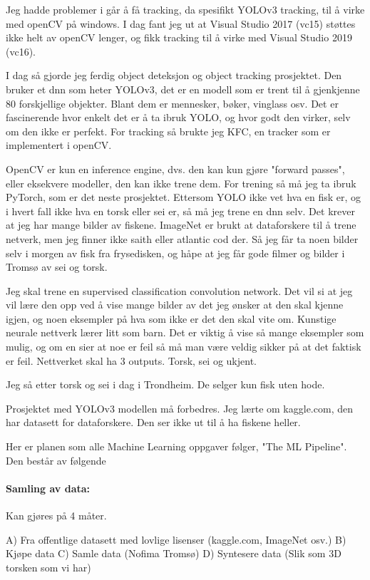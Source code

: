 Jeg hadde problemer i går å få tracking, da spesifikt YOLOv3 tracking, til å virke med openCV på windows. I dag fant jeg ut at Visual Studio 2017 (vc15) støttes ikke helt av openCV lenger, og fikk tracking til å virke med Visual Studio 2019 (vc16).

I dag så gjorde jeg ferdig object deteksjon og object tracking prosjektet. Den bruker et dnn som heter YOLOv3, det er en modell som er trent til å gjenkjenne 80 forskjellige objekter. Blant dem er mennesker, bøker, vinglass osv. Det er fascinerende hvor enkelt det er å ta ibruk YOLO, og hvor godt den virker, selv om den ikke er perfekt. For tracking så brukte jeg KFC, en tracker som er implementert i openCV.

OpenCV er kun en inference engine, dvs. den kan kun gjøre "forward passes", eller eksekvere modeller, den kan ikke trene dem. For trening så må jeg ta ibruk PyTorch, som er det neste prosjektet. Ettersom YOLO ikke vet hva en fisk er, og i hvert fall ikke hva en torsk eller sei er, så må jeg trene en dnn selv. Det krever at jeg har mange bilder av fiskene. ImageNet er brukt at dataforskere til å trene netverk, men jeg finner ikke saith eller atlantic cod der. Så jeg får ta noen bilder selv i morgen av fisk fra frysedisken, og håpe at jeg får gode filmer og bilder i Tromsø av sei og torsk.

Jeg skal trene en supervised classification convolution network. Det vil si at jeg vil lære den opp ved å vise mange bilder av det jeg ønsker at den skal kjenne igjen, og noen eksempler på hva som ikke er det den skal vite om. Kunstige neurale nettverk lærer litt som barn. Det er viktig å vise så mange eksempler som mulig, og om en sier at noe er feil så må man være veldig sikker på at det faktisk er feil. Nettverket skal ha 3 outputs. Torsk, sei og ukjent.

Jeg så etter torsk og sei i dag i Trondheim. De selger kun fisk uten hode.

Prosjektet med YOLOv3 modellen må forbedres. Jeg lærte om kaggle.com, den har datasett for dataforskere. Den ser ikke ut til å ha fiskene heller.

Her er planen som alle Machine Learning oppgaver følger, "The ML Pipeline". Den består av følgende

\paragraph{Samling av data:} Kan gjøres på 4 måter.

A) Fra offentlige datasett med lovlige lisenser (kaggle.com, ImageNet osv.)
B) Kjøpe data
C) Samle data (Nofima Tromsø)
D) Syntesere data (Slik som 3D torsken som vi har)

